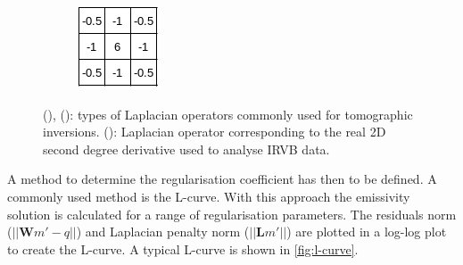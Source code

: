 \begin{figure}[!ht]
\begin{subfigure}{0.15\linewidth}
         \caption{}
         \label{fig:Laplacian_std2}
     \end{subfigure}
     \hfill
     \begin{subfigure}{0.15\linewidth}
         \centering
         \includegraphics[trim={0 4 4 0},clip,width=\textwidth]{Chapters/chapter2/figs/Laplacian_IRVB.png}
         \caption{}
         \label{fig:Laplacian_IRVB}
     \end{subfigure}
    \caption{(), (): types of Laplacian operators commonly used for tomographic inversions.\cite{Fisher2004} (): Laplacian operator corresponding to the real 2D second degree derivative used to analyse IRVB data.}
    \label{fig:Laplacian}
\end{figure}

A method to determine the regularisation coefficient has then to be defined. A commonly used method is the L-curve.\cite{Schou2015} With this approach the emissivity solution is calculated for a range of regularisation parameters. The residuals norm ($||\bm{W}m'-q||$) and Laplacian penalty norm ($||\bm{L}m'||$) are plotted in a log-log plot to create the L-curve. A typical L-curve is shown in \autoref{fig:l-curve}.

